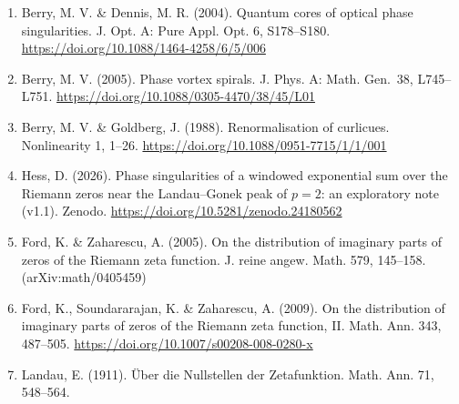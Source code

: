 \documentclass[
  10pt,
]{article}
\begin{document}
\begin{enumerate}
  singularities in monochromatic waves. Proc. R. Soc. Lond. A 457,
  2251--2263. \url{https://doi.org/10.1098/rspa.2001.0826}
\item
  Berry, M. V. \& Dennis, M. R. (2004). Quantum cores of optical phase
  singularities. J. Opt. A: Pure Appl. Opt. 6, S178--S180.
  \url{https://doi.org/10.1088/1464-4258/6/5/006}
\item
  Berry, M. V. (2005). Phase vortex spirals. J. Phys. A: Math. Gen.~38,
  L745--L751. \url{https://doi.org/10.1088/0305-4470/38/45/L01}
\item
  Berry, M. V. \& Goldberg, J. (1988). Renormalisation of curlicues.
  Nonlinearity 1, 1--26. \url{https://doi.org/10.1088/0951-7715/1/1/001}
\item
  Hess, D. (2026). Phase singularities of a windowed exponential sum
  over the Riemann zeros near the Landau--Gonek peak of \(p = 2\): an
  exploratory note (v1.1). Zenodo.
  \url{https://doi.org/10.5281/zenodo.24180562}
\item
  Ford, K. \& Zaharescu, A. (2005). On the distribution of imaginary
  parts of zeros of the Riemann zeta function. J. reine angew. Math.
  579, 145--158. (arXiv:math/0405459)
\item
  Ford, K., Soundararajan, K. \& Zaharescu, A. (2009). On the
  distribution of imaginary parts of zeros of the Riemann zeta function,
  II. Math. Ann. 343, 487--505.
  \url{https://doi.org/10.1007/s00208-008-0280-x}
\item
  Landau, E. (1911). Über die Nullstellen der Zetafunktion. Math. Ann.
  71, 548--564.
\end{enumerate}
\end{document}
